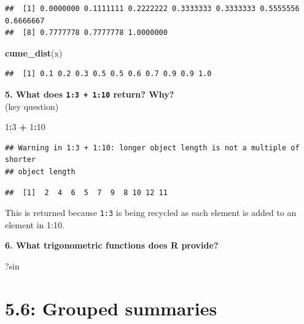 \documentclass[]{book}
\newenvironment{Shaded}{\begin{snugshade}}{\end{snugshade}}
\newcommand{\DecValTok}[1]{\textcolor[rgb]{0.00,0.00,0.81}{#1}}
\newcommand{\KeywordTok}[1]{\textcolor[rgb]{0.13,0.29,0.53}{\textbf{#1}}}
\newcommand{\NormalTok}[1]{#1}
\newcommand{\OperatorTok}[1]{\textcolor[rgb]{0.81,0.36,0.00}{\textbf{#1}}}
\newcommand{\StringTok}[1]{\textcolor[rgb]{0.31,0.60,0.02}{#1}}
\theoremstyle{definition}
\theoremstyle{definition}
\theoremstyle{definition}
\theoremstyle{remark}
\begin{document}
\begin{verbatim}
##  [1] 0.0000000 0.1111111 0.2222222 0.3333333 0.3333333 0.5555556 0.6666667
##  [8] 0.7777778 0.7777778 1.0000000
\end{verbatim}

\begin{Shaded}
\begin{Highlighting}[]
\KeywordTok{cume_dist}\NormalTok{(x)}
\end{Highlighting}
\end{Shaded}

\begin{verbatim}
##  [1] 0.1 0.2 0.3 0.5 0.5 0.6 0.7 0.9 0.9 1.0
\end{verbatim}

\textbf{5. What does \texttt{1:3\ +\ 1:10} return? Why?}\\
(key question)

\begin{Shaded}
\begin{Highlighting}[]
\DecValTok{1}\OperatorTok{:}\DecValTok{3} \OperatorTok{+}\StringTok{ }\DecValTok{1}\OperatorTok{:}\DecValTok{10}
\end{Highlighting}
\end{Shaded}

\begin{verbatim}
## Warning in 1:3 + 1:10: longer object length is not a multiple of shorter
## object length
\end{verbatim}

\begin{verbatim}
##  [1]  2  4  6  5  7  9  8 10 12 11
\end{verbatim}

This is returned because \texttt{1:3} is being recycled as each element
is added to an element in 1:10.

\textbf{6. What trigonometric functions does R provide?}

\begin{Shaded}
\begin{Highlighting}[]
\NormalTok{?sin}
\end{Highlighting}
\end{Shaded}

\hypertarget{grouped-summaries}{%
\section{5.6: Grouped summaries}\label{grouped-summaries}}
\end{document}
